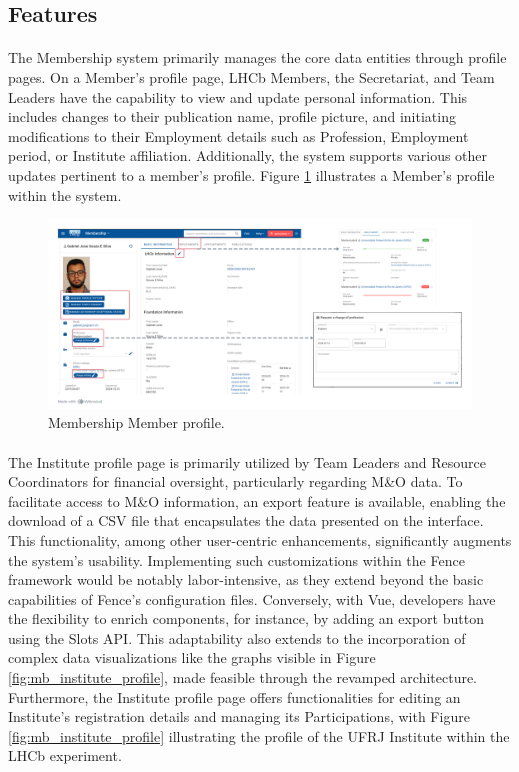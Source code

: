 \subsection{Features}
\paragraph{}The Membership system primarily manages the core data entities through profile pages. On a Member's profile page, LHCb Members, the Secretariat, and Team Leaders have the capability to view and update personal information. This includes changes to their publication name, profile picture, and initiating modifications to their Employment details such as Profession, Employment period, or Institute affiliation. Additionally, the system supports various other updates pertinent to a member's profile. Figure \ref{fig:member_profile} illustrates a Member's profile within the system.

\begin{figure} [H]
    \centering
    \includegraphics[width=1\linewidth]{figuras/profile.png}
    \caption{Membership Member profile.}
    \label{fig:member_profile}
\end{figure}

\paragraph{} The Institute profile page is primarily utilized by Team Leaders and Resource Coordinators for financial oversight, particularly regarding M\&O data. To facilitate access to M\&O information, an export feature is available, enabling the download of a CSV file that encapsulates the data presented on the interface. This functionality, among other user-centric enhancements, significantly augments the system's usability. Implementing such customizations within the Fence framework would be notably labor-intensive, as they extend beyond the basic capabilities of Fence's configuration files. Conversely, with Vue, developers have the flexibility to enrich components, for instance, by adding an export button using the Slots API. This adaptability also extends to the incorporation of complex data visualizations like the graphs visible in Figure \ref{fig:mb_institute_profile}, made feasible through the revamped architecture. Furthermore, the Institute profile page offers functionalities for editing an Institute's registration details and managing its Participations, with Figure \ref{fig:mb_institute_profile} illustrating the profile of the UFRJ Institute within the LHCb experiment.

